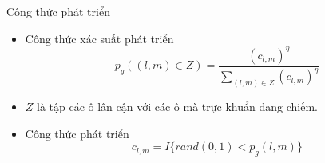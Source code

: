 \begin{frame}{Công thức phát triển}
\begin{itemize}
    \item Công thức xác suất phát triển
    \begin{equation}
    	p_g((l, m) \in Z) = \frac{(c_{l, m})^{\eta}}{\sum_{(l, m) \in Z}^{} (c_{l, m})^{\eta}}
	\end{equation}
	\item $Z$ là tập các ô lân cận với các ô mà trực khuẩn đang chiếm.
	\item Công thức phát triển
	\begin{equation}
		c_{l, m} = I\{rand(0, 1) < p_g(l, m)\}
	\end{equation}
\end{itemize}
\end{frame}